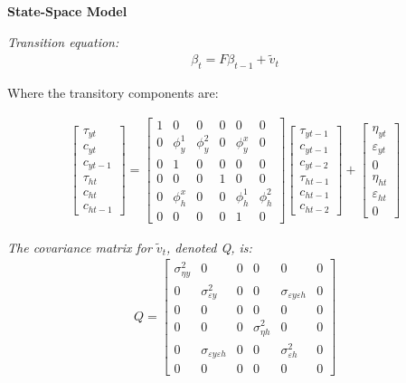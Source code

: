 \documentclass[fleqn]{article}
\begin{document}
\begin{outline}[enumerate]
		
		\textbf{State-Space Model}
		
		\textit{Transition equation:}
		\begin{align}
		\beta_t = F\beta_{t-1} + \tilde{v}_t
		\end{align}
		
		Where the transitory components are:
		
		\begin{align}
		\begin{bmatrix}
		\tau_{yt}	\\
		c_{yt}		\\
		c_{yt-1}		\\
		\tau_{ht}	\\
		c_{ht}		\\
		c_{ht-1}		
		\end{bmatrix}
		=
		\begin{bmatrix}
		1	& 0	& 0	& 0	& 0	& 0	\\
		0	& \phi^1_y	& \phi^2_y	& 0	& \phi^x_y	& 0	\\
		0	& 1	& 0	& 0 & 0 & 0  \\
		0	& 0	& 0	& 1	& 0	& 0 \\
		0	& \phi^x_h	& 0	& 0 &\phi^1_h	& \phi^2_h	\\
		0	& 0	& 0	& 0 & 1 & 0
		\end{bmatrix}
		\begin{bmatrix}
		\tau_{yt-1}	\\
		c_{yt-1}		\\
		c_{yt-2}		\\
		\tau_{ht-1}	\\
		c_{ht-1}		\\
		c_{ht-2}		
		\end{bmatrix}
		+
		\begin{bmatrix}
		\eta_{yt}	\\
		\varepsilon_{yt}		\\
		0	\\
		\eta_{ht}	\\
		\varepsilon_{ht}		\\
		0	
		\end{bmatrix}
		\end{align}
		
		\textit{The covariance matrix for $\tilde{v}_t$, denoted Q, is: }
		\begin{align}
		Q = 
		\begin{bmatrix}
		\sigma^2_{\eta y}	& 0	 &0 & 0	& 0	& 0	\\
		0	& \sigma^2_{\varepsilon y}	& 0	& 0	& \sigma_{\varepsilon y \varepsilon h}	& 0	\\
		0	&	0	& 0 & 0 & 0 & 0	\\
		0	& 0	& 0	& \sigma^2_{\eta h}	& 0	& 0	\\
		0	& \sigma_{\varepsilon y \varepsilon h}	& 0	& 0	& \sigma^2_{\varepsilon h}		& 0	\\
		0	&0	& 0	& 0
		& 0	& 0
		\end{bmatrix}
		\end{align}
		

\end{outline}
\end{document}
